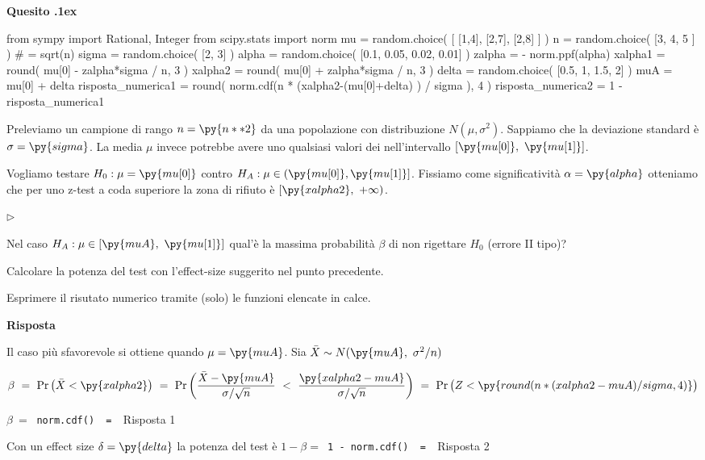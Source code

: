 \documentclass[11pt,twoside,a4paper]{article}
\newcommand{\mylabel}[1]{#1\hfill}
\renewenvironment{itemize}
  {\begin{list}{$\triangleright$}{%
   \setlength{\parskip}{0mm}
   \setlength{\topsep}{.4\baselineskip}
   \setlength{\rightmargin}{0mm}
   \setlength{\listparindent}{0mm}
   \setlength{\itemindent}{0mm}
   \setlength{\labelwidth}{2ex}
   \setlength{\itemsep}{.4\baselineskip}
   \setlength{\parsep}{0mm}
   \setlength{\partopsep}{0mm}
   \setlength{\labelsep}{1ex}
   \setlength{\leftmargin}{\labelwidth+\labelsep}
   \let\makelabel\mylabel}}{%
   \end{list}\vspace*{-1.3mm}}
\def\Pr{{\rm Pr\,}}
\newcounter{quesito}
\newenvironment{question}{\bigskip\addtocounter{quesito}{1}\par\textbf{Quesito \thequesito.\kern1ex}}{\vspace{\parskip}}
\newenvironment{answer}{\par\textbf{Risposta\quad}}{\vspace{\parskip}}
\begin{document}
\begin{question} %
\begin{pycode}
from sympy import Rational, Integer
from scipy.stats import norm
mu = random.choice( [ [1,4], [2,7], [2,8] ] )
n = random.choice( [3, 4, 5 ] ) # = sqrt(n)
sigma = random.choice( [2, 3] )
alpha = random.choice( [0.1, 0.05, 0.02, 0.01] )
zalpha = - norm.ppf(alpha) 
xalpha1 = round( mu[0] - zalpha*sigma / n, 3 )
xalpha2 = round( mu[0] + zalpha*sigma / n, 3 )
delta = random.choice( [0.5, 1, 1.5, 2] )
muA = mu[0] + delta
risposta_numerica1 = round( norm.cdf(n * (xalpha2-(mu[0]+delta) ) / sigma ), 4 )
risposta_numerica2 = 1 - risposta_numerica1
\end{pycode}
Preleviamo un campione di rango $n=\py{n**2}$ da una popolazione con distribuzione $N(\mu,\sigma^2)$. Sappiamo che la deviazione standard è $\sigma=\py{sigma}$. La media $\mu$ invece potrebbe avere uno qualsiasi valori dei nell'intervallo $[\py{mu[0]},\ \py{mu[1]}  ]$.

Vogliamo testare $H_0:\mu=\py{mu[0]}$ contro $H_A:\mu\in (\py{mu[0]},\py{mu[1]}]$. Fissiamo come significatività $\alpha=\py{alpha}$ otteniamo che per uno z-test a coda superiore la zona di rifiuto è $[\py{xalpha2}, \ +\infty)$.

\begin{itemize}
\item[1.] Nel caso $H_A:\mu\in [\py{muA},\ \py{mu[1]}]$ qual'è la massima probabilità $\beta$ di non rigettare $H_0$ (errore II tipo)?
\item[2.] Calcolare la potenza del test con l'effect-size suggerito nel punto precedente.
\end{itemize}

Esprimere il risutato numerico tramite (solo) le funzioni elencate in calce.

\begin{answer}

Il caso più sfavorevole si ottiene quando $\mu = \py{muA}$. Sia $\bar X\sim N(\py{muA},\ \sigma^2/n)$

$\beta
\ =\ 
\Pr\big(\bar X < \py{xalpha2} \big)
\ =\ 
\Pr\bigg( \dfrac{\bar X - \py{muA} }{\sigma/\sqrt{n}}\ <\ \dfrac{\py{xalpha2-muA} }{\sigma/\sqrt{n} }\bigg)
\ =\ 
\Pr\big( Z<  \py{round( n * (xalpha2-muA ) / sigma, 4) }\big)$


{\color{blue}$\beta
\ =\ $}
{\color{blue}\tt norm.cdf() }{\tt\ =\  }{\color{blue}\hfill Risposta 1}

\medskip
Con un effect size $\delta=\py{delta}$ la potenza del test è $1-\beta=${\color{blue}\tt\ 1 - norm.cdf() }{\tt\ =\  }{\color{blue}\hfill Risposta 2}

\end{answer}
\end{question}
\end{document}
